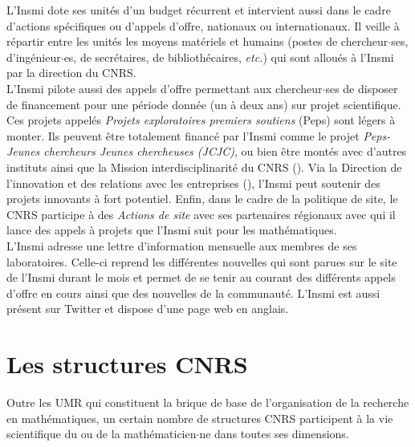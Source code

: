 L'Insmi dote ses unit\'es d'un 
budget r\'ecurrent et intervient aussi dans le cadre d'actions sp\'ecifiques ou d'appels d'offre, nationaux ou  internationaux. Il veille \`a r\'epartir entre les unit\'es les 
 moyens mat\'eriels et humains
(postes de chercheur$\cdot$ses, d'ing\'enieur$\cdot$es, de secr\'etaires, de biblioth\'ecaires, {\em
etc.}) qui sont allou\'es \`a l'Insmi par la direction du CNRS.\\

L'Insmi pilote aussi des appels d'offre permettant aux chercheur$\cdot$ses de disposer de financement pour une p\'eriode donn\'ee (un \`a deux ans) sur projet scientifique. Ces projets appel\'es {\it Projets exploratoires premiers soutiens} (Peps) sont l\'egers \`a monter. Ils peuvent \^etre totalement financ\'e par l'Insmi comme le projet {\it Peps-Jeunes chercheurs Jeunes chercheuses (JCJC)}, ou bien \^etre mont\'es avec d'autres instituts ainsi que la Mission interdisciplinarit\'e du CNRS (). Via la Direction de l'innovation et des relations avec les entreprises (), l'Insmi peut soutenir des projets innovants \`a fort potentiel.  Enfin, dans le cadre de la politique de site, le CNRS participe \`a des {\it Actions de site} avec ses partenaires r\'egionaux avec qui il lance des appels \`a projets que l'Insmi suit pour les math\'ematiques.\\

L'Insmi adresse une lettre d'information mensuelle aux membres de ses laboratoires. Celle-ci reprend les diff\'erentes nouvelles qui sont parues sur le site de l'Insmi durant le mois et permet de se tenir au courant des diff\'erents appels d'offre en cours ainsi que des nouvelles de la communaut\'e. L'Insmi est aussi pr\'esent sur Twitter et dispose d'une page web en anglais. 


\section{Les structures CNRS}



Outre les UMR qui constituent la brique de base de l'organisation de la recherche en math\'ematiques, un certain nombre de structures CNRS participent \`a la vie scientifique du ou de la math\'ematicien$\cdot$ne dans toutes ses dimensions. 




